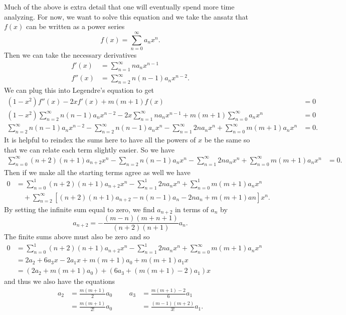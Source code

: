 Much of the above is extra detail that one will eventually spend more time analyzing. For now, we want to solve this equation and we take the ansatz that $f(x)$ can be written as a power series
\[
f(x)=\sum_{n=0}^\infty a_n x^n.
\]
Then we can take the necessary derivatives
\begin{align*}
    f'(x)&=\sum_{n=1}^\infty na_n x^{n-1}\\
    f''(x)&= \sum_{n=2}^\infty n(n-1) a_n x^{n-2}.
\end{align*}
We can plug this into Legendre's equation to get
\begin{align*}
    (1-x^2)f''(x)-2xf'(x)+m(m+1)f(x)&=0\\
    (1-x^2)\sum_{n=2}^\infty n(n-1)a_n x^{n-2} - 2x \sum_{n=1}^\infty na_n x^{n-1} +m(m+1) \sum_{n=0}^\infty a_n x^n &=0\\
    \sum_{n=2}^\infty n(n-1) a_n x^{n-2} - \sum_{n=2}^\infty n(n-1)a_n x^n -\sum_{n=1}^\infty 2n a_n x^{n}+\sum_{n=0}^\infty m(m+1)a_n x^n &=0.
\end{align*}
It is helpful to reindex the sums here to have all the powers of $x$ be the same so that we can relate each term slightly easier. So we have
\begin{align*}
    \sum_{n=0}^\infty (n+2)(n+1) a_{n+2} x^n - \sum_{n=2} n(n-1) a_n x^n - \sum_{n=1}^\infty 2na_n x^n +\sum_{n=0}^\infty m(m+1)a_n x^n &=0.
\end{align*}
Then if we make all the starting terms agree as well we have
\begin{align*}
    0&= \sum_{n=0}^1 (n+2)(n+1)a_{n+2}x^n -\sum_{n=1}^1 2na_n x^n +\sum_{n=0}^1
    m(m+1)a_n x^n\\
    &\quad + \sum_{n=2}^\infty \left[ (n+2)(n+1)a_{n+2}-n(n-1)a_n -2na_n +m(m+1)an\right]x^n.
\end{align*}
By setting the infinite sum equal to zero, we find $a_{n+2}$ in terms of $a_n$ by
\[
a_{n+2} = -\frac{(m-n)(m+n+1)}{(n+2)(n+1)}a_n.
\]
The finite sums above must also be zero and so
\begin{align*}
    0&= \sum_{n=0}^1 (n+2)(n+1)a_{n+2}x^n -\sum_{n=1}^1 2na_n x^n + \sum_{n=0}^\infty m(m+1)a_n x^n \\
    &= 2a_2 + 6a_3 x - 2a_1 x + m(m+1)a_0 + m(m+1) a_1 x\\
    &= (2a_2 +m(m+1)a_0)+(6a_3+(m(m+1)-2)a_1)x
\end{align*}
and thus we also have the equations
\begin{align*}
    a_2 &= \frac{m(m+1)}{2}a_0 &&& a_3 &= \frac{m(m+1)-2}{6}a_1\\
        &= \frac{m(m+1)}{2!} a_0 &&&  &= \frac{(m-1)(m+2)}{3!}a_1.
\end{align*}
